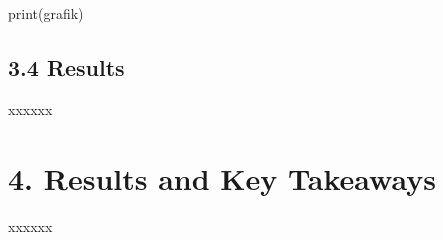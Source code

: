 \documentclass[
  11pt,
  a4paper,
  DIV=11,
  numbers=noendperiod]{scrartcl}
\begin{document}
print(grafik)

\subsection{3.4 Results}\label{results}

xxxxxx

\section{4. Results and Key Takeaways}\label{results-and-key-takeaways}

xxxxxx
\end{document}
